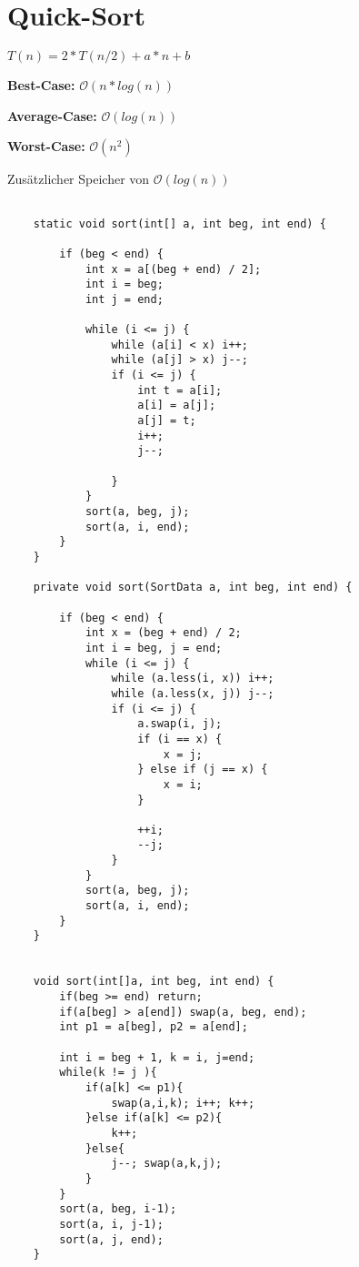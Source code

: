 \section*{Quick-Sort}

$T(n) = 2*T(n/2) + a*n + b$

\textbf{Best-Case:} $\mathcal{O}(n*log(n))$

\textbf{Average-Case:} $\mathcal{O}(log(n))$

\textbf{Worst-Case:} $\mathcal{O}(n^2)$

Zusätzlicher Speicher von $\mathcal{O}(log(n))$

\begin{verbatim}

	static void sort(int[] a, int beg, int end) {

        if (beg < end) {
            int x = a[(beg + end) / 2];
            int i = beg;
            int j = end;

            while (i <= j) {
                while (a[i] < x) i++;
                while (a[j] > x) j--;
                if (i <= j) {
                    int t = a[i];
                    a[i] = a[j];
                    a[j] = t;
                    i++;
                    j--;

                }
            }
            sort(a, beg, j);
            sort(a, i, end);
        }
    }

    private void sort(SortData a, int beg, int end) {

        if (beg < end) {
            int x = (beg + end) / 2;
            int i = beg, j = end;
            while (i <= j) {
                while (a.less(i, x)) i++;
                while (a.less(x, j)) j--;
                if (i <= j) {
                    a.swap(i, j);
                    if (i == x) {
                        x = j;
                    } else if (j == x) {
                        x = i;
                    }

                    ++i;
                    --j;
                }
            }
            sort(a, beg, j);
            sort(a, i, end);
        }
    }
    
    
   	void sort(int[]a, int beg, int end) {
        if(beg >= end) return;
        if(a[beg] > a[end]) swap(a, beg, end);
        int p1 = a[beg], p2 = a[end];

        int i = beg + 1, k = i, j=end;
        while(k != j ){
            if(a[k] <= p1){
                swap(a,i,k); i++; k++;
            }else if(a[k] <= p2){
                k++;
            }else{
                j--; swap(a,k,j);
            }
        }
        sort(a, beg, i-1);
        sort(a, i, j-1);
        sort(a, j, end);
    }

\end{verbatim}